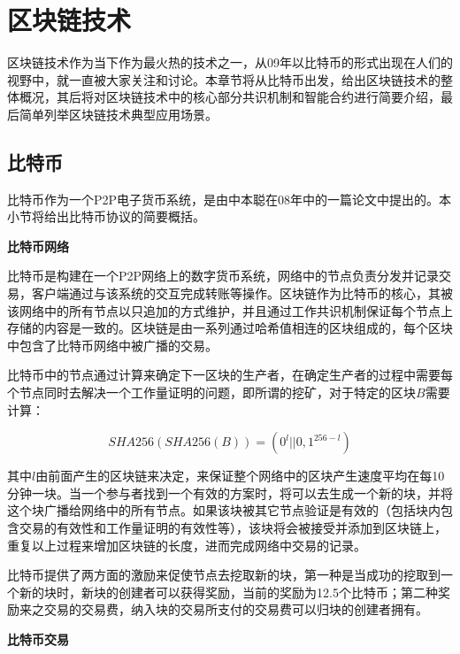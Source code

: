 
\chapter{区块链技术}

区块链技术作为当下作为最火热的技术之一，从09年以比特币的形式出现在人们的视野中，就一直被大家关注和讨论。本章节将从比特币出发，给出区块链技术的整体概况，其后将对区块链技术中的核心部分共识机制和智能合约进行简要介绍，最后简单列举区块链技术典型应用场景。

\section{比特币}


比特币作为一个P2P电子货币系统，是由中本聪在08年中的一篇论文中提出\cite{nakamoto2008bitcoin}的。本小节将给出比特币协议的简要概括。



\noindent\textbf{比特币网络}

比特币是构建在一个P2P网络上的数字货币系统，网络中的节点负责分发并记录交易，客户端通过与该系统的交互完成转账等操作。区块链作为比特币的核心，其被该网络中的所有节点以只追加的方式维护，并且通过工作共识机制保证每个节点上存储的内容是一致的。区块链是由一系列通过哈希值相连的区块组成的，每个区块中包含了比特币网络中被广播的交易。

比特币中的节点通过计算来确定下一区块的生产者，在确定生产者的过程中需要每个节点同时去解决一个工作量证明的问题，即所谓的挖矿，对于特定的区块$B$需要计算：

\begin{equation}\label{eqGenCmpPk}
SHA256(SHA256(B)) = (0^l||{0,1}^{256-l})
\end{equation}

其中$l$由前面产生的区块链来决定，来保证整个网络中的区块产生速度平均在每10分钟一块。当一个参与者找到一个有效的方案时，将可以去生成一个新的块，并将这个块广播给网络中的所有节点。如果该块被其它节点验证是有效的（包括块内包含交易的有效性和工作量证明的有效性等），该块将会被接受并添加到区块链上，重复以上过程来增加区块链的长度，进而完成网络中交易的记录。

比特币提供了两方面的激励来促使节点去挖取新的块，第一种是当成功的挖取到一个新的块时，新块的创建者可以获得奖励，当前的奖励为12.5个比特币；第二种奖励来之交易的交易费，纳入块的交易所支付的交易费可以归块的创建者拥有。


\noindent\textbf{比特币交易}

